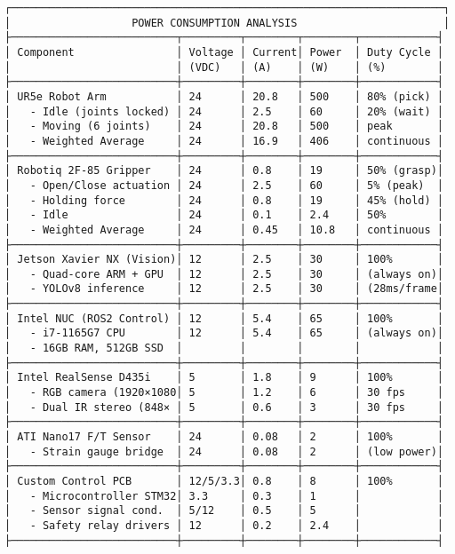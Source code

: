 \documentclass[
]{article}
\begin{document}
\begin{verbatim}
┌────────────────────────────────────────────────────────────────────┐
│                   POWER CONSUMPTION ANALYSIS                       │
├──────────────────────────┬─────────┬────────┬────────┬────────────┤
│ Component                │ Voltage │ Current│ Power  │ Duty Cycle │
│                          │ (VDC)   │ (A)    │ (W)    │ (%)        │
├──────────────────────────┼─────────┼────────┼────────┼────────────┤
│ UR5e Robot Arm           │ 24      │ 20.8   │ 500    │ 80% (pick) │
│   - Idle (joints locked) │ 24      │ 2.5    │ 60     │ 20% (wait) │
│   - Moving (6 joints)    │ 24      │ 20.8   │ 500    │ peak       │
│   - Weighted Average     │ 24      │ 16.9   │ 406    │ continuous │
├──────────────────────────┼─────────┼────────┼────────┼────────────┤
│ Robotiq 2F-85 Gripper    │ 24      │ 0.8    │ 19     │ 50% (grasp)│
│   - Open/Close actuation │ 24      │ 2.5    │ 60     │ 5% (peak)  │
│   - Holding force        │ 24      │ 0.8    │ 19     │ 45% (hold) │
│   - Idle                 │ 24      │ 0.1    │ 2.4    │ 50%        │
│   - Weighted Average     │ 24      │ 0.45   │ 10.8   │ continuous │
├──────────────────────────┼─────────┼────────┼────────┼────────────┤
│ Jetson Xavier NX (Vision)│ 12      │ 2.5    │ 30     │ 100%       │
│   - Quad-core ARM + GPU  │ 12      │ 2.5    │ 30     │ (always on)│
│   - YOLOv8 inference     │ 12      │ 2.5    │ 30     │ (28ms/frame│
├──────────────────────────┼─────────┼────────┼────────┼────────────┤
│ Intel NUC (ROS2 Control) │ 12      │ 5.4    │ 65     │ 100%       │
│   - i7-1165G7 CPU        │ 12      │ 5.4    │ 65     │ (always on)│
│   - 16GB RAM, 512GB SSD  │         │        │        │            │
├──────────────────────────┼─────────┼────────┼────────┼────────────┤
│ Intel RealSense D435i    │ 5       │ 1.8    │ 9      │ 100%       │
│   - RGB camera (1920×1080│ 5       │ 1.2    │ 6      │ 30 fps     │
│   - Dual IR stereo (848× │ 5       │ 0.6    │ 3      │ 30 fps     │
├──────────────────────────┼─────────┼────────┼────────┼────────────┤
│ ATI Nano17 F/T Sensor    │ 24      │ 0.08   │ 2      │ 100%       │
│   - Strain gauge bridge  │ 24      │ 0.08   │ 2      │ (low power)│
├──────────────────────────┼─────────┼────────┼────────┼────────────┤
│ Custom Control PCB       │ 12/5/3.3│ 0.8    │ 8      │ 100%       │
│   - Microcontroller STM32│ 3.3     │ 0.3    │ 1      │            │
│   - Sensor signal cond.  │ 5/12    │ 0.5    │ 5      │            │
│   - Safety relay drivers │ 12      │ 0.2    │ 2.4    │            │
├──────────────────────────┼─────────┼────────┼────────┼────────────┤

\end{verbatim}
\end{document}
